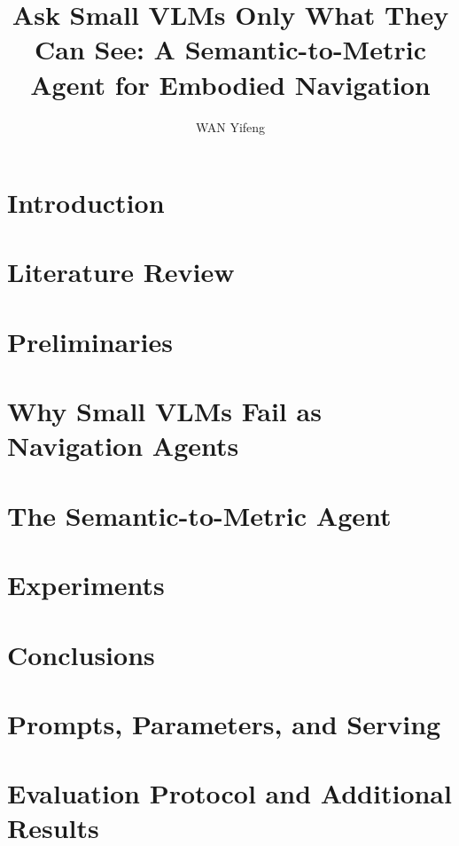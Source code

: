 \documentclass[a4paper]{template/hkustgz-thesis}
\title{Ask Small VLMs Only What They Can See: A Semantic-to-Metric Agent for Embodied Navigation}
\author{WAN Yifeng}
\begin{document}
\maketitle
\setcounter{page}{2}  %
\makeauthorization
\makesignature

\begin{acknowledgments}

\end{acknowledgments}

\clearpage
{}
\tableofcontents
\clearpage
{}
\listoffigures
\clearpage
{}
\listoftables

\begin{abstract}

\end{abstract}

\mainmatter

\chapter{Introduction}


\chapter{Literature Review}


\chapter{Preliminaries}


\chapter{Why Small VLMs Fail as Navigation Agents}


\chapter{The Semantic-to-Metric Agent}


\chapter{Experiments}


\chapter{Conclusions}


\printthebibliography

\appendix
\chapter{Prompts, Parameters, and Serving}


\chapter{Evaluation Protocol and Additional Results}

\end{document}
